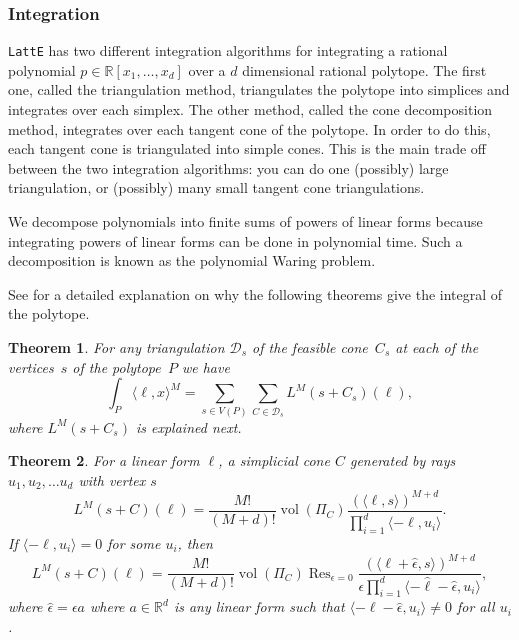 \documentclass{article}
\newcommand{\R}{{\mathbb R}}
\newcommand{\latte}{{\tt LattE}\xspace}
\DeclareMathOperator{\vol}{vol}     %
\DeclareMathOperator{\Res}{Res}  %
\renewcommand\d{\,\mathrm{d}}
\newtheorem{theorem}{Theorem}
\begin{document}
\subsubsection{Integration}

\latte has two different integration algorithms for integrating a rational polynomial $p \in \R[x_1, \dots, x_d]$ over a $d$ dimensional rational polytope. The first one, called the triangulation method, triangulates the polytope into simplices and integrates over each simplex. The other method, called the cone decomposition method, integrates over each tangent cone of the polytope. In order to do this, each tangent cone is triangulated into simple cones. This is the main trade off between the two integration algorithms: you can do one (possibly) large triangulation, or (possibly) many small tangent cone triangulations. 

We decompose polynomials into finite sums of powers of linear forms because integrating powers of linear forms can be done in polynomial time. Such a decomposition is known as the polynomial Waring problem.

See \cite{howToIntegratePolynomialSimplex} for a detailed explanation on why the following theorems give the integral of the polytope.

\begin{theorem} \label{cor:the-lawrence-method}
For any triangulation $\mathcal D_s$ of the feasible cone~$C_s$ at each of the
vertices~$s$ of the polytope~$P$ we have 
\begin{equation}
	\int_P \langle \ell, x \rangle^M
        =\sum_{s\in V(P)} \sum_{C \in \mathcal D_s} L^M(s+C_s)(\ell),
\end{equation}
	where $L^M(s+C_s)$ is explained next.
\end{theorem}

\begin{theorem} 
  For a linear form $\ell$, a simplicial cone $C$ generated by rays $u_1,u_2,\dots u_d$ with vertex $s$
	\begin{equation}
	L^M(s+C)(\ell) 
	=\frac{M!}{(M+d)!} \vol(\Pi_C) \frac{(\langle \ell, s \rangle)^{M+d}}{\prod_{i=1}^d  \langle -\ell, u_i \rangle}.
	\end{equation}
	If $\langle -\ell, u_i \rangle = 0$ for some $u_i$, then
	\begin{equation}
	L^M(s+C)(\ell) 
	=\frac{M!}{(M+d)!} \vol(\Pi_C) \Res_{\epsilon=0}\frac{(\langle \ell + \hat \epsilon, s \rangle)^{M+d}}{\epsilon \prod_{i=1}^d  \langle -\hat \ell - 	\hat \epsilon, u_i \rangle},
	\end{equation}
	where $\hat \epsilon = \epsilon a$ where $a \in \R^d$ is any linear form such that $\langle -\ell - \hat \epsilon, u_i \rangle \neq 0$ for all $u_i$.
\end{theorem}	
	
\end{document}
